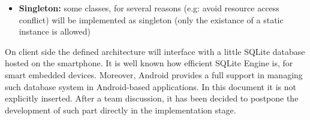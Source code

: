 \begin{flushleft}
{\begin{itemize}
\begin{itemize}
		\item prevent third parties to access user datasets before allowing the system to certificate their identity and check the status of the relative request. The \textit{RequestManager} once ensured the second mentioned condition, delegates to the \textit{PrivacyAndSecurityEvaluator} the responsibilities to certificate the identity of the requester and to ensure that all the privacy constraints are respected by anonymous requests.
	\end{itemize} 
	\item \textbf{Singleton:} some classes, for several reasons (e.g: avoid resource access conflict) will be implemented as singleton (only the existance of a static instance is allowed)
\end{itemize}
}


{}
On client side the defined architecture will interface with a little SQLite database hosted on the smartphone. It is well known how efficient SQLite Engine is, for smart embedded devices. Moreover, Android provides a full support in managing such database system in Android-based applications. In this document it is not explicitly inserted. After a team discussion, it has been decided to postpone the development of such part directly in the implementation stage. 

\end{flushleft}
